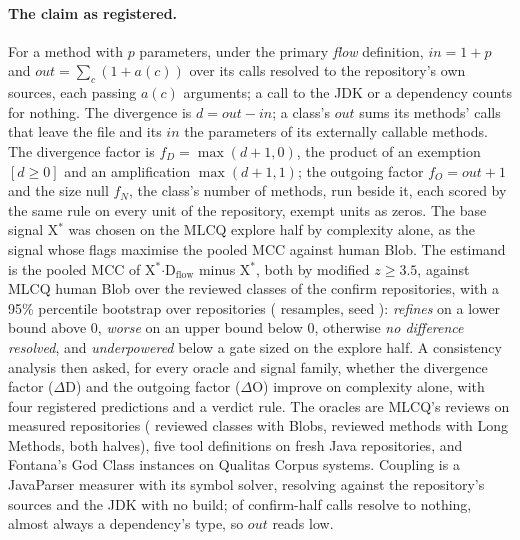 \documentclass[11pt,a4paper]{article}
\newcommand{\madz}{modified $z \geq 3.5$}
\newcommand{\Xs}{X$^*$}
\newcommand{\Dflow}{D$_{\text{flow}}$}
\newcommand{\dD}{$\Delta$D}
\newcommand{\dO}{$\Delta$O}
\begin{document}
\paragraph{The claim as registered.} For a method with $p$ parameters,
under the primary \emph{flow} definition, $\mathit{in} = 1 + p$ and
$\mathit{out} = \sum_c (1 + a(c))$ over its calls resolved to the
repository's own sources, each passing $a(c)$ arguments; a call to the JDK
or a dependency counts for nothing. The divergence is $d = \mathit{out} -
\mathit{in}$; a class's $\mathit{out}$ sums its methods' calls that leave
the file and its $\mathit{in}$ the parameters of its externally callable
methods. The divergence
factor is $f_D = \max(d + 1, 0)$, the product of an exemption $[d \geq 0]$
and an amplification $\max(d + 1, 1)$; the outgoing factor $f_O =
\mathit{out} + 1$ and the size null $f_N$, the class's number of methods,
run beside it, each scored by the same rule on every unit of the
repository, exempt units as zeros. The base signal \Xs{} was chosen on the
MLCQ explore half by complexity alone, as the signal whose flags maximise
the pooled MCC against human Blob. The estimand is the pooled MCC of
\Xs$\cdot$\Dflow{} minus \Xs{}, both by \madz{}, against MLCQ human Blob
over the reviewed classes of the confirm repositories, with a 95\%
percentile bootstrap over repositories (\bootB{} resamples, seed
\bootSeed{}): \emph{refines} on a lower bound above 0, \emph{worse} on an
upper bound below 0, otherwise \emph{no difference resolved}, and
\emph{underpowered} below a gate sized on the explore half. A consistency analysis then asked, for every oracle and signal family,
whether the divergence factor (\dD) and the outgoing factor (\dO) improve
on complexity alone, with four registered predictions and a verdict rule. The oracles are MLCQ's reviews on \mlcqMeasured{} measured
repositories (\mlcqBlobReviewed{} reviewed classes with \mlcqBlob{} Blobs,
\mlcqLongReviewed{} reviewed methods with \mlcqLong{} Long Methods, both
halves), five tool definitions on \seedThreeMeasured{} fresh Java
repositories, and Fontana's \fontanaInstances{} God Class instances on
\fontanaSystems{} Qualitas Corpus systems. Coupling is a JavaParser
measurer with its symbol solver, resolving against the repository's sources
and the JDK with no build; \callsMlcqUnresolved{} of confirm-half calls
resolve to nothing, almost always a dependency's type, so $\mathit{out}$
reads low.
\end{document}
